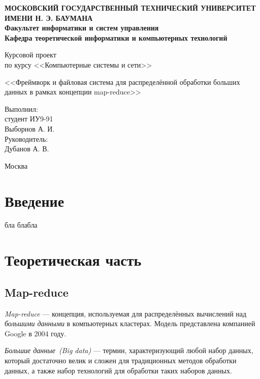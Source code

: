 \documentclass[12pt,a4paper,oneside]{extarticle}
\begin{document}
\pgfplotsset{compat=1.8}

\thispagestyle{empty}
\newpage
{
\centering


\textbf{
МОСКОВСКИЙ ГОСУДАРСТВЕННЫЙ ТЕХНИЧЕСКИЙ УНИВЕРСИТЕТ ИМЕНИ Н. Э. БАУМАНА \\
Факультет информатики и систем управления \\
Кафедра теоретической информатики и компьютерных технологий}
\bigskip
\bigskip
\bigskip
\bigskip
\bigskip
\bigskip
\bigskip

\vfill


Курсовой проект \\
по курсу <<Компьютерные системы и сети>>

\bigskip

{\large <<Фреймворк и файловая система для распределённой обработки больших данных в рамках концепции map-reduce>>}
\bigskip

\vfill



\hfill\parbox{4cm} {
Выполнил:\\
студент ИУ9-91 \hfill \\
Выборнов А. И.\hfill \medskip\\
Руководитель:\\
Дубанов А. В.\hfill
}


\vspace{\fill}

Москва \number\year
\clearpage
}


\tableofcontents

\clearpage


\section*{Введение}
   бла блабла
\clearpage

\section{Теоретическая часть}
    \subsection{Map-reduce}
        {\it Map-reduce} --- концепция, используемая для распределённых вычислений над {\it большими данными} в компьютерных кластерах. Модель представлена компанией Google в 2004 году.

        {\it Большие данные~(Big data)} --- термин, характеризующий любой набор данных, который достаточно велик и сложен для традиционных методов обработки данных, а также набор технологий для обработки таких наборов данных.
        
\end{document}

